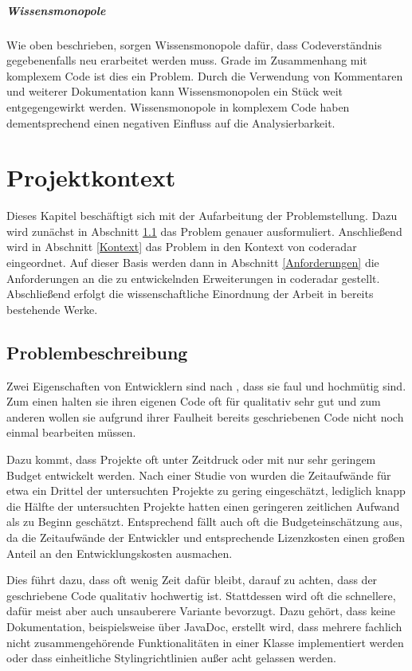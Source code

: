 \documentclass[
	oneside,  %
	ngerman, 
	final, 
	11pt, 
	a4paper, 
	1.1headlines, 
	headinclude=false, 
	footinclude=false, 
	mpinclude=false, 
	pagesize, 
	onecolumn, 
	titlepage, 
	parskip=half, 
	headsepline, 
	chapterprefix=false, 
	version=first, 
	listof=totoc, 
	bibliography=totoc, 
	toc=graduated, 
	fleqn
]{scrbook}
\begin{document}
\paragraph{Wissensmonopole}
Wie oben beschrieben, sorgen Wissensmonopole dafür, dass Codeverständnis gegebenenfalls neu erarbeitet werden muss.
Grade im Zusammenhang mit komplexem Code ist dies ein Problem.
Durch die Verwendung von Kommentaren und weiterer Dokumentation kann Wissensmonopolen ein Stück weit entgegengewirkt werden.
Wissensmonopole in komplexem Code haben dementsprechend einen negativen Einfluss auf die Analysierbarkeit.

\chapter{Projektkontext}
\label{Projektkontext}
Dieses Kapitel beschäftigt sich mit der Aufarbeitung der Problemstellung.
Dazu wird zunächst in Abschnitt \ref{Problembeschreibung} das Problem genauer ausformuliert.
Anschließend wird in Abschnitt \ref{Kontext} das Problem in den Kontext von coderadar eingeordnet.
Auf dieser Basis werden dann in Abschnitt \ref{Anforderungen} die Anforderungen an die zu entwickelnden Erweiterungen in coderadar gestellt.
Abschließend erfolgt die wissenschaftliche Einordnung der Arbeit in bereits bestehende Werke.

\section{Problembeschreibung}
\label{Problembeschreibung}
Zwei Eigenschaften von Entwicklern sind nach \cite{WCSP1996}, dass sie faul und hochmütig sind.
Zum einen halten sie ihren eigenen Code oft für qualitativ sehr gut und zum anderen wollen sie aufgrund ihrer Faulheit bereits geschriebenen Code nicht noch einmal bearbeiten müssen.

Dazu kommt, dass Projekte oft unter Zeitdruck oder mit nur sehr geringem Budget entwickelt werden.
Nach einer Studie von \cite{KPME2002} wurden die Zeitaufwände für etwa ein Drittel der untersuchten Projekte zu gering eingeschätzt, lediglich knapp die Hälfte der untersuchten Projekte hatten einen geringeren zeitlichen Aufwand als zu Beginn geschätzt.
Entsprechend fällt auch oft die Budgeteinschätzung aus, da die Zeitaufwände der Entwickler und entsprechende Lizenzkosten einen großen Anteil an den Entwicklungskosten ausmachen.

Dies führt dazu, dass oft wenig Zeit dafür bleibt, darauf zu achten, dass der geschriebene Code qualitativ hochwertig ist.
Stattdessen wird oft die schnellere, dafür meist aber auch unsauberere Variante bevorzugt.
Dazu gehört, dass keine Dokumentation, beispielsweise über JavaDoc, erstellt wird, dass mehrere fachlich nicht zusammengehörende Funktionalitäten in einer Klasse implementiert werden oder dass einheitliche Stylingrichtlinien außer acht gelassen werden. 
\end{document}
